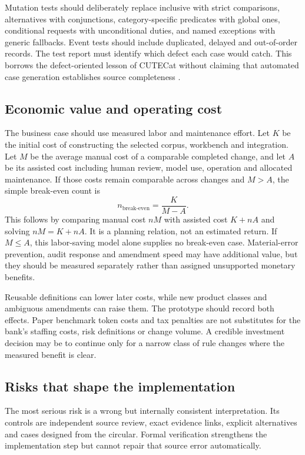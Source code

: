 Mutation tests should deliberately replace inclusive with strict comparisons,
alternatives with conjunctions, category-specific predicates with global ones,
conditional requests with unconditional duties, and named exceptions with generic
fallbacks. Event tests should include duplicated, delayed and out-of-order records.
The test report must identify which defect each case would catch. This borrows
the defect-oriented lesson of CUTECat without claiming that automated case
generation establishes source completeness \citep{cutecat2025}.

\subsection{Economic value and operating cost}

The business case should use measured labor and maintenance effort. Let $K$ be
the initial cost of constructing the selected corpus, workbench and integration.
Let $M$ be the average manual cost of a comparable completed change, and let $A$
be its assisted cost including human review, model use, operation and allocated
maintenance. If those costs remain comparable across changes and $M>A$, the
simple break-even count is
\begin{equation}
 n_{\mathrm{break\text{-}even}}=\frac{K}{M-A}.
 \label{eq:cost}
\end{equation}
This follows by comparing manual cost $nM$ with assisted cost $K+nA$ and solving
$nM=K+nA$. It is a planning relation, not an estimated return. If $M\leq A$, this
labor-saving model alone supplies no break-even case. Material-error prevention,
audit response and amendment speed may have additional value, but they should be
measured separately rather than assigned unsupported monetary benefits.

Reusable definitions can lower later costs, while new product classes and
ambiguous amendments can raise them. The prototype should record both effects.
Paper benchmark token costs and tax penalties are not substitutes for the bank's
staffing costs, risk definitions or change volume. A credible investment decision
may be to continue only for a narrow class of rule changes where the measured
benefit is clear.

\subsection{Risks that shape the implementation}

The most serious risk is a wrong but internally consistent interpretation. Its
controls are independent source review, exact evidence links, explicit alternatives
and cases designed from the circular. Formal verification strengthens the
implementation step but cannot repair that source error automatically.


